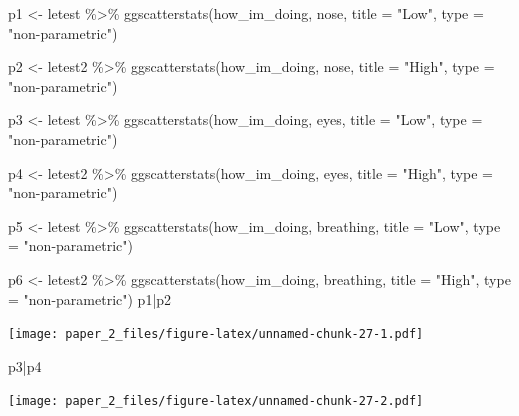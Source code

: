 \documentclass[
]{article}
\newenvironment{Shaded}{\begin{snugshade}}{\end{snugshade}}
\newcommand{\AttributeTok}[1]{\textcolor[rgb]{0.77,0.63,0.00}{#1}}
\newcommand{\FunctionTok}[1]{\textcolor[rgb]{0.00,0.00,0.00}{#1}}
\newcommand{\NormalTok}[1]{#1}
\newcommand{\OtherTok}[1]{\textcolor[rgb]{0.56,0.35,0.01}{#1}}
\newcommand{\SpecialCharTok}[1]{\textcolor[rgb]{0.00,0.00,0.00}{#1}}
\newcommand{\StringTok}[1]{\textcolor[rgb]{0.31,0.60,0.02}{#1}}
\begin{document}
\begin{Shaded}
\begin{Highlighting}[]
\NormalTok{p1 }\OtherTok{\textless{}{-}}\NormalTok{ letest }\SpecialCharTok{\%\textgreater{}\%}
  \FunctionTok{ggscatterstats}\NormalTok{(how\_im\_doing, nose, }\AttributeTok{title =} \StringTok{"Low"}\NormalTok{, }\AttributeTok{type =} \StringTok{"non{-}parametric"}\NormalTok{)}


\NormalTok{p2 }\OtherTok{\textless{}{-}}\NormalTok{ letest2 }\SpecialCharTok{\%\textgreater{}\%}
  \FunctionTok{ggscatterstats}\NormalTok{(how\_im\_doing, nose, }\AttributeTok{title =} \StringTok{"High"}\NormalTok{, }\AttributeTok{type =} \StringTok{"non{-}parametric"}\NormalTok{)}

\NormalTok{p3 }\OtherTok{\textless{}{-}}\NormalTok{ letest }\SpecialCharTok{\%\textgreater{}\%}
  \FunctionTok{ggscatterstats}\NormalTok{(how\_im\_doing, eyes, }\AttributeTok{title =} \StringTok{"Low"}\NormalTok{, }\AttributeTok{type =} \StringTok{"non{-}parametric"}\NormalTok{)}


\NormalTok{p4 }\OtherTok{\textless{}{-}}\NormalTok{ letest2 }\SpecialCharTok{\%\textgreater{}\%}
  \FunctionTok{ggscatterstats}\NormalTok{(how\_im\_doing, eyes, }\AttributeTok{title =} \StringTok{"High"}\NormalTok{, }\AttributeTok{type =} \StringTok{"non{-}parametric"}\NormalTok{)}

\NormalTok{p5 }\OtherTok{\textless{}{-}}\NormalTok{ letest }\SpecialCharTok{\%\textgreater{}\%}
  \FunctionTok{ggscatterstats}\NormalTok{(how\_im\_doing, breathing, }\AttributeTok{title =} \StringTok{"Low"}\NormalTok{, }\AttributeTok{type =} \StringTok{"non{-}parametric"}\NormalTok{)}


\NormalTok{p6 }\OtherTok{\textless{}{-}}\NormalTok{ letest2 }\SpecialCharTok{\%\textgreater{}\%}
  \FunctionTok{ggscatterstats}\NormalTok{(how\_im\_doing, breathing, }\AttributeTok{title =} \StringTok{"High"}\NormalTok{, }\AttributeTok{type =} \StringTok{"non{-}parametric"}\NormalTok{)}
\NormalTok{p1}\SpecialCharTok{|}\NormalTok{p2}
\end{Highlighting}
\end{Shaded}

\texttt{[image: paper\_2\_files/figure-latex/unnamed-chunk-27-1.pdf]}

\begin{Shaded}
\begin{Highlighting}[]
\NormalTok{p3}\SpecialCharTok{|}\NormalTok{p4}
\end{Highlighting}
\end{Shaded}

\texttt{[image: paper\_2\_files/figure-latex/unnamed-chunk-27-2.pdf]}
\end{document}
